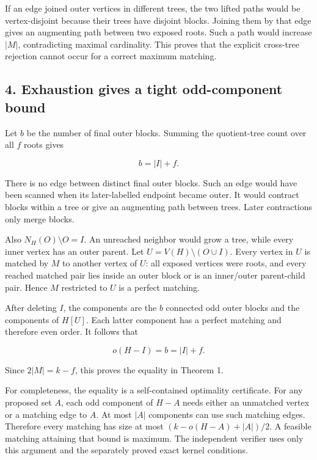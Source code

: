 If an edge joined outer vertices in different trees, the two lifted paths would be vertex-disjoint because their trees have disjoint blocks. Joining them by that edge gives an augmenting path between two exposed roots. Such a path would increase \(|M|\), contradicting maximal cardinality. This proves that the explicit cross-tree rejection cannot occur for a correct maximum matching.

\hypertarget{af-43f6530146-exhaustion-gives-a-tight-odd-component-bound}{%
\subsection{4. Exhaustion gives a tight odd-component bound}\label{af-43f6530146-exhaustion-gives-a-tight-odd-component-bound}}

Let \(b\) be the number of final outer blocks. Summing the quotient-tree count over all \(f\) roots gives

\[
b=|I|+f.
\]

There is no edge between distinct final outer blocks. Such an edge would have been scanned when its later-labelled endpoint became outer. It would contract blocks within a tree or give an augmenting path between trees. Later contractions only merge blocks.

Also \(N_H(O)\setminus O=I\). An unreached neighbor would grow a tree, while every inner vertex has an outer parent. Let \(U=V(H)\setminus(O\cup I)\). Every vertex in \(U\) is matched by \(M\) to another vertex of \(U\): all exposed vertices were roots, and every reached matched pair lies inside an outer block or is an inner/outer parent-child pair. Hence \(M\) restricted to \(U\) is a perfect matching.

After deleting \(I\), the components are the \(b\) connected odd outer blocks and the components of \(H[U]\). Each latter component has a perfect matching and therefore even order. It follows that

\[
o(H-I)=b=|I|+f.
\]

Since \(2|M|=k-f\), this proves the equality in Theorem 1.

For completeness, the equality is a self-contained optimality certificate. For any proposed set \(A\), each odd component of \(H-A\) needs either an unmatched vertex or a matching edge to \(A\). At most \(|A|\) components can use such matching edges. Therefore every matching has size at most \((k-o(H-A)+|A|)/2\). A feasible matching attaining that bound is maximum. The independent verifier uses only this argument and the separately proved exact kernel conditions.

